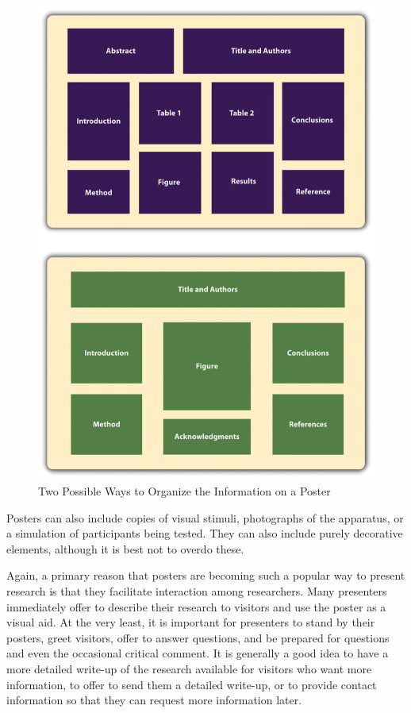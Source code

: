 \begin{figure}
\includegraphics[width=\linewidth]{figures/C11posters}
\caption{Two Possible Ways to Organize the Information on a Poster}
\label{fig:posters}
\end{figure}

Posters can also include copies of visual stimuli, photographs of the apparatus, or a simulation of participants being tested. They can also include purely decorative elements, although it is best not to overdo these.

Again, a primary reason that posters are becoming such a popular way to present research is that they facilitate interaction among researchers. Many presenters immediately offer to describe their research to visitors and use the poster as a visual aid. At the very least, it is important for presenters to stand by their posters, greet visitors, offer to answer questions, and be prepared for questions and even the occasional critical comment. It is generally a good idea to have a more detailed write-up of the research available for visitors who want more information, to offer to send them a detailed write-up, or to provide contact information so that they can request more information later.


